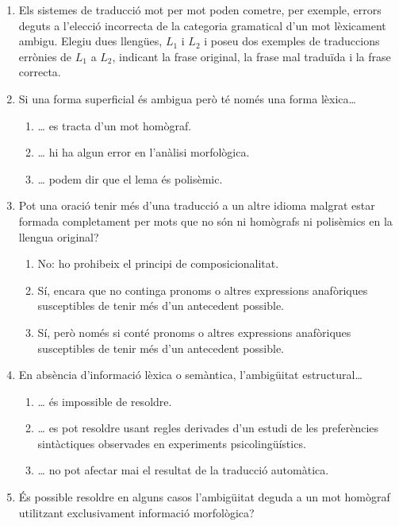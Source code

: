 \begin{enumerate}
    \item Els sistemes de traducció mot per mot poden cometre, per
      exemple, errors deguts a l'elecció incorrecta de la categoria
      gramatical d'un mot lèxicament ambigu. Elegiu dues llengües,
      $L_1$ i $L_2$ i poseu dos exemples de traduccions errònies de
      $L_1$ a $L_2$, indicant la frase original, la frase mal traduïda
      i la frase correcta.

\item 
   Si una forma superficial és ambigua però té només una forma lèxica{\ldots}
   
\begin{enumerate}
\item {\ldots} es tracta d'un mot homògraf.
\item {\ldots} hi ha algun error en l'anàlisi morfològica.
\item {\ldots} podem dir que el lema és polisèmic.
\end{enumerate}

\item 
   Pot una oració tenir més d'una traducció a un altre idioma malgrat
   estar formada completament per mots que no són ni homògrafs ni
   polisèmics en la llengua original?
   
\begin{enumerate}
\item No: ho prohibeix el principi de composicionalitat.
\item Sí, encara que no continga pronoms o altres
     expressions anafòriques susceptibles de tenir més d'un antecedent
     possible.
\item Sí, però només si conté pronoms o altres
     expressions anafòriques susceptibles de tenir més d'un antecedent
     possible.
\end{enumerate}


\item En absència d'informació lèxica o semàntica, l'ambigüitat
estructural{\ldots}
\begin{enumerate}
\item {\ldots} és impossible de resoldre.
\item {\ldots} es pot resoldre usant regles derivades d'un estudi de les preferències
sintàctiques observades en experiments psicolingüístics.
\item {\ldots} no pot afectar mai el resultat de la traducció automàtica. 
\end{enumerate}

\item 
És possible resoldre en alguns casos l'ambigüitat deguda a un
mot homògraf utilitzant exclusivament informació morfològica?


\end{enumerate}
